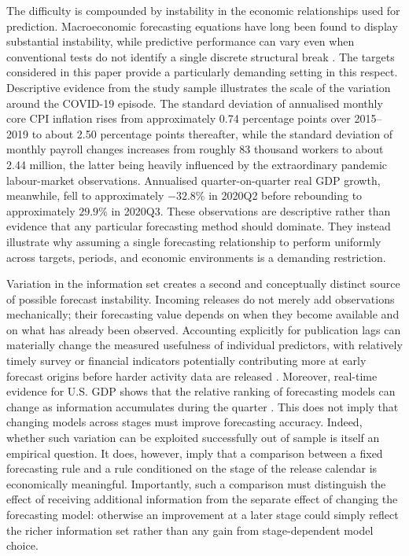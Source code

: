 The difficulty is compounded by instability in the economic relationships used
for prediction. Macroeconomic forecasting equations have long been found to
display substantial instability, while predictive performance can vary even
when conventional tests do not identify a single discrete structural break
\citep{stockwatson1996instability,rossi2021instability}. The targets considered
in this paper provide a particularly demanding setting in this respect.
Descriptive evidence from the study sample illustrates the scale of the
variation around the COVID-19 episode. The standard deviation of annualised
monthly core CPI inflation rises from approximately 0.74 percentage points over
2015--2019 to about 2.50 percentage points thereafter, while the standard
deviation of monthly payroll changes increases from roughly 83 thousand workers
to about 2.44 million, the latter being heavily influenced by the extraordinary
pandemic labour-market observations. Annualised quarter-on-quarter real GDP
growth, meanwhile, fell to approximately $-32.8\%$ in 2020Q2 before rebounding
to approximately $29.9\%$ in 2020Q3. These observations are descriptive rather
than evidence that any particular forecasting method should dominate. They
instead illustrate why assuming a single forecasting relationship to perform
uniformly across targets, periods, and economic environments is a demanding
restriction.

Variation in the information set creates a second and conceptually distinct
source of possible forecast instability. Incoming releases do not merely add
observations mechanically; their forecasting value depends on when they become
available and on what has already been observed. Accounting explicitly for
publication lags can materially change the measured usefulness of individual
predictors, with relatively timely survey or financial indicators potentially
contributing more at early forecast origins before harder activity data are
released \citep{banbura2011blackbox}. Moreover, real-time evidence for U.S. GDP
shows that the relative ranking of forecasting models can change as information
accumulates during the quarter \citep{aastveit2014density}. This does not imply
that changing models across stages must improve forecasting accuracy. Indeed,
whether such variation can be exploited successfully out of sample is itself an
empirical question. It does, however, imply that a comparison between a fixed
forecasting rule and a rule conditioned on the stage of the release calendar is
economically meaningful. Importantly, such a comparison must distinguish the
effect of receiving additional information from the separate effect of changing
the forecasting model: otherwise an improvement at a later stage could simply
reflect the richer information set rather than any gain from stage-dependent
model choice.

